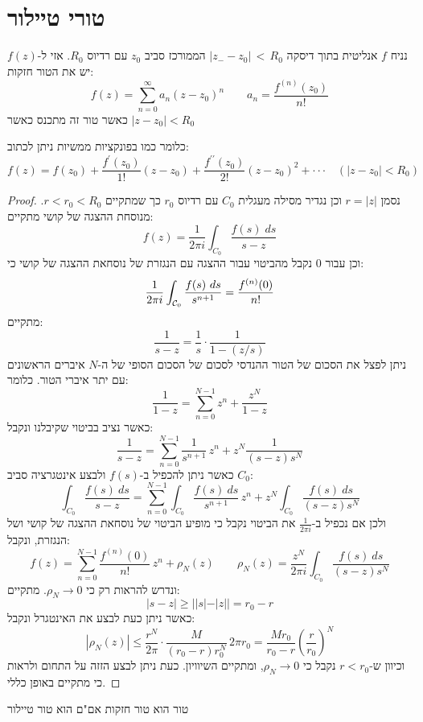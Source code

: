\documentclass{tstextbook}
\begin{document}
\section{טורי טיילור}

\begin{theorem}[טיילור]
נניח \(f\) אנליטית בתוך דיסקה \(|z_{\mathrm{-}}-z_{0}|\,<\,R_{0}\) הממורכז סביב \(z_{0}\) עם רדיוס \(R_{0}\). אזי ל-\(f(z)\) יש את הטור חזקות:
$$f(z)=\sum_{n=0}^{\infty}a_{n}(z-z_{0})^{n} \qquad a_{n}={\frac{f^{(n)}(z_{0})}{n!}}$$
כאשר טור זה מתכנס כאשר \(|z-z_{0}|<R_{0}\)

\end{theorem}
כלומר כמו בפונקציות ממשיות ניתן לכתוב:
$$f(z)=f(z_{0})+\frac{f^{\prime}(z_{0})}{1!}(z-z_{0})+\frac{f^{\prime\prime}(z_{0})}{2!}(z-z_{0})^{2}+\cdot\cdot\cdot\quad(\left|z-z_{0}\right|<R_{0})$$

\begin{proof}
נסמן \(r=|z|\) וכן נגדיר מסילה מעגלית \(C_{0}\) עם רדיוס \(r_{0}\) כך שמתקיים \(r<r_{0}<R_{0}\).
מנוסחת ההצגה של קושי מתקיים:
$$f(z)={\frac{1}{2\pi i}}\int_{C_{0}}{\frac{f(s)\;d s}{s-z}}$$
וכן עבור 0 נקבל מהביטוי עבור ההצגה עם הנגזרת של נוסחאת ההצגה של קושי כי:
$$\frac{1}{2\pi i}\int_{{\cal C}_{0}}\frac{f(s)~d s}{s^{n+1}}=\frac{f^{(n)}(0)}{n!}$$
מתקיים:
$$\frac{1}{s-z}=\frac{1}{s}\cdot\frac{1}{1-(z/s)}$$
 ניתן לפצל את הסכום של הטור ההנדסי לסכום של הסכום הסופי של ה-\(N\) איברים הראשונים עם יתר איברי הטור. כלומר:
$$\frac{1}{1-z}=\sum_{n=0}^{N-1}z^{n}+\frac{z^{N}}{1-z}$$
כאשר נציב בביטוי שקיבלנו ונקבל:
$$\frac{1}{s-z}=\sum_{n=0}^{N-1}\frac{1}{s^{n+1}}\,z^{n}+z^{N}\frac{1}{(s-z)s^{N}}$$
כאשר ניתן להכפיל ב-\(f(s)\) ולבצע אינטגרציה סביב \(C_{0}\):
$$\int_{C_{0}}{\frac{f(s)\ d s}{s-z}}=\sum_{n=0}^{N-1}\int_{C_{0}}{\frac{f(s)\ d s}{s^{n+1}}}\,z^{n}+z^{N}\int_{C_{0}}{\frac{f(s)\ d s}{(s-z)s^{N}}}$$
ולכן אם נכפיל ב-\(\frac{1}{2\pi i}\) את הביטוי נקבל כי מופיע הביטוי של נוסחאת ההצגה של קושי ושל הנגזרת, ונקבל:
$$f(z)=\sum_{n=0}^{N-1}\frac{f^{(n)}(0)}{n!}\,z^{n}+\rho_{N}(z) \qquad \rho_{N}(z)=\frac{z^{N}}{2\pi i}\int_{C_{0}}\frac{f(s)\ d s}{(s-z)s^{N}}$$
ונדרש להראות רק כי \(\rho_{N}\to 0\). מתקיים:
$$|s-z|\geq||s|-|z||=r_{0}-r$$
כאשר ניתן כעת לבצע את האינטגרל ונקבל:
$$|\rho_{N}(z)|\leq{\frac{r^{N}}{2\pi}}\cdot{\frac{M}{(r_{0}-r)r_{0}^{N}}}\,2\pi r_{0}={\frac{M r_{0}}{r_{0}-r}}\left({\frac{r}{r_{0}}}\right)^{N}$$
וכיוון ש-\(r<r_{0}\) נקבל כי \(\rho_{N}\to 0\), ומתקיים השיוויון. כעת ניתן לבצע הזזה על התחום ולראות כי מתקיים באופן כללי.

\end{proof}
\begin{proposition}
טור הוא טור חזקות אם"ם הוא טור טיילור

\end{proposition}
\end{document}
